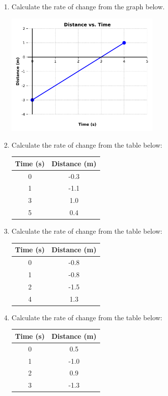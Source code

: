 \documentclass[12pt]{article}
\begin{document}
\begin{enumerate}
\vspace{2cm}  %
\item Calculate the rate of change from the graph below.

\includegraphics[width=0.6\textwidth]{B_problem_4.png}


\vspace{2cm}  %
\item Calculate the rate of change from the table below:

\begin{tabular}{|c|c|}
\hline
Time (s) & Distance (m) \\
\hline
0 & -0.3 \\
1 & -1.1 \\
3 & 1.0 \\
5 & 0.4 \\
\hline
\end{tabular}

\vspace{2cm}
\item Calculate the rate of change from the table below:

\begin{tabular}{|c|c|}
\hline
Time (s) & Distance (m) \\
\hline
0 & -0.8 \\
1 & -0.8 \\
2 & -1.5 \\
4 & 1.3 \\
\hline
\end{tabular}

\vspace{2cm}
\item Calculate the rate of change from the table below:

\begin{tabular}{|c|c|}
\hline
Time (s) & Distance (m) \\
\hline
0 & 0.5 \\
1 & -1.0 \\
2 & 0.9 \\
3 & -1.3 \\
\hline
\end{tabular}


\end{enumerate}
\end{document}
